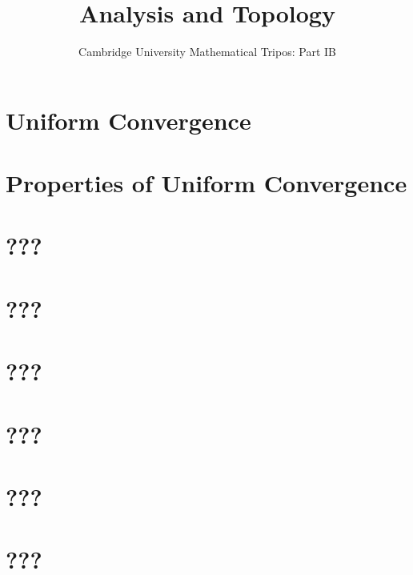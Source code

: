 \documentclass{article}
\title{Analysis and Topology}
\author{Cambridge University Mathematical Tripos: Part IB}
\begin{document}
\maketitle

\tableofcontentsnewpage{}

\section{Uniform Convergence}

\section{Properties of Uniform Convergence}

\section{???}

\section{???}

\section{???}

\section{???}

\section{???}

\section{???}

\end{document}
